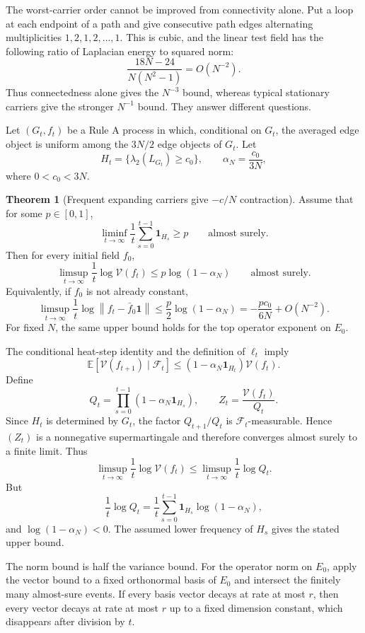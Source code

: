 \documentclass[11pt]{article}
\makeatletter
\newcommand{\E}{\mathbb E}
\newcommand{\V}{\mathcal V}
\newcommand{\one}{\mathbf 1}
\newcommand{\norm}[1]{\left\|#1\right\|}
\theoremstyle{definition}
\newtheorem{theorem}{Theorem}
\renewenvironment{proof}[1][\proofname]{\par
  \pushQED{\qed}%
  \normalfont \topsep6\p@\@plus6\p@\relax
  \trivlist
  \item[\hskip\labelsep\bfseries #1\@addpunct{.}]\ignorespaces
}{%
  \popQED\endtrivlist\@endpefalse
}
\makeatother
\begin{document}
The worst-carrier order cannot be improved from connectivity alone.  Put a
loop at each endpoint of a path and give consecutive path edges alternating
multiplicities $1,2,1,2,\ldots,1$.  This is cubic, and the linear test field
has the following ratio of Laplacian energy to squared norm:
\[
    \frac{18N-24}{N(N^2-1)}=O(N^{-2}).
\]
Thus connectedness alone gives the $N^{-3}$ bound, whereas typical stationary
carriers give the stronger $N^{-1}$ bound.  They answer different questions.

Let $(G_t,f_t)$ be a Rule A process in which, conditional on $G_t$, the averaged
edge object is uniform among the $3N/2$ edge objects of $G_t$.  Let
\[
    H_t=\{\lambda_2(L_{G_t})\ge c_0\},
    \qquad
    \alpha_N=\frac{c_0}{3N},
\]
where $0<c_0<3N$.

\begin{theorem}[Frequent expanding carriers give $-c/N$ contraction]
Assume that for some $p\in[0,1]$,
\[
    \liminf_{t\to\infty}
    \frac1t\sum_{s=0}^{t-1}\mathbf 1_{H_s}
    \ge p
    \qquad\text{almost surely}.
\]
Then for every initial field $f_0$,
\[
    \limsup_{t\to\infty}
    \frac1t\log\V(f_t)
    \le
    p\log(1-\alpha_N)
    \qquad\text{almost surely}.
\]
Equivalently, if $f_0$ is not already constant,
\[
    \limsup_{t\to\infty}
    \frac1t\log\norm{f_t-\bar f_0\one}
    \le
    \frac p2\log(1-\alpha_N)
    =
    -\frac{pc_0}{6N}+O(N^{-2}).
\]
For fixed $N$, the same upper bound holds for the top operator exponent on
$E_0$.
\end{theorem}

\begin{proof}
The conditional heat-step identity and the definition of $\ell_t$ imply
\[
    \E[\V(f_{t+1})\mid\mathcal F_t]
    \le
    (1-\alpha_N\mathbf 1_{H_t})\V(f_t).
\]
Define
\[
    Q_t=\prod_{s=0}^{t-1}(1-\alpha_N\mathbf 1_{H_s}),
    \qquad
    Z_t=\frac{\V(f_t)}{Q_t}.
\]
Since $H_t$ is determined by $G_t$, the factor $Q_{t+1}/Q_t$ is
$\mathcal F_t$-measurable.  Hence $(Z_t)$ is a nonnegative supermartingale and
therefore converges almost surely to a finite limit.  Thus
\[
    \limsup_{t\to\infty}\frac1t\log\V(f_t)
    \le
    \limsup_{t\to\infty}\frac1t\log Q_t.
\]
But
\[
    \frac1t\log Q_t
    =
    \frac1t\sum_{s=0}^{t-1}
    \mathbf 1_{H_s}\log(1-\alpha_N),
\]
and $\log(1-\alpha_N)<0$.  The assumed lower frequency of $H_s$ gives the stated
upper bound.

The norm bound is half the variance bound.  For the operator norm on $E_0$,
apply the vector bound to a fixed orthonormal basis of $E_0$ and intersect the
finitely many almost-sure events.  If every basis vector decays at rate at most
$r$, then every vector decays at rate at most $r$ up to a fixed dimension
constant, which disappears after division by $t$.
\end{proof}
\end{document}
